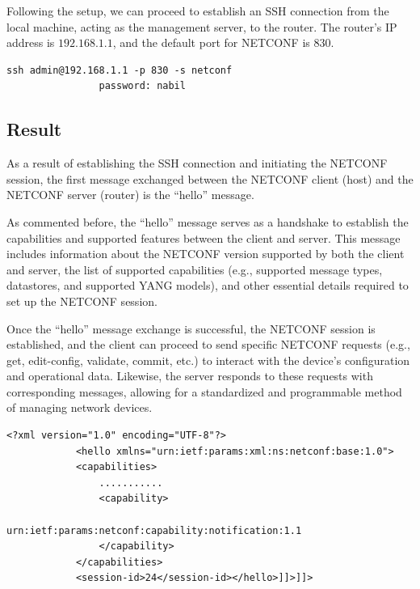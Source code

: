 Following the setup, we can proceed to establish an SSH connection from the local machine, acting as the management server, to the router. The router's IP address is $192.168.1.1$, and the default port for NETCONF is $830$.
\begin{lstlisting}[style=ubuntutermStyle,  backgroundcolor=\color{codebackground}]
                ssh admin@192.168.1.1 -p 830 -s netconf 
                password: nabil
\end{lstlisting}

\subsection{Result}

As a result of establishing the SSH connection and initiating the NETCONF session, the first message exchanged between the NETCONF client (host) and the NETCONF server (router) is the ``hello'' message. 

As commented before, the ``hello'' message serves as a handshake to establish the capabilities and supported features between the client and server. This message includes information about the NETCONF version supported by both the client and server, the list of supported capabilities (e.g., supported message types, datastores, and supported YANG models), and other essential details required to set up the NETCONF session.

Once the ``hello'' message exchange is successful, the NETCONF session is established, and the client can proceed to send specific NETCONF requests (e.g., get, edit-config, validate, commit, etc.) to interact with the device's configuration and operational data. Likewise, the server responds to these requests with corresponding messages, allowing for a standardized and programmable method of managing network devices.


\begin{lstlisting}[style=xmlStyle, caption={Excerpt from "hello" message.},  backgroundcolor=\color{codebackground}]
            <?xml version="1.0" encoding="UTF-8"?>
            <hello xmlns="urn:ietf:params:xml:ns:netconf:base:1.0">
            <capabilities>
                ...........
                <capability>
                    urn:ietf:params:netconf:capability:notification:1.1
                </capability>
            </capabilities>
            <session-id>24</session-id></hello>]]>]]>
\end{lstlisting}


